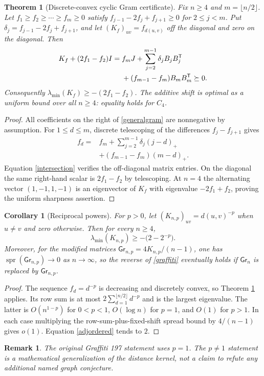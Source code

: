 \documentclass[10pt,twocolumn]{article}
\newtheorem{theorem}{Theorem}
\newtheorem{corollary}{Corollary}
\newtheorem{remark}{Remark}
\newcommand{\Gr}{\mathsf{Gr}}
\newcommand{\spr}{\operatorname{spr}}
\newcommand{\lammin}{\lambda_{\min}}
\begin{document}
\begin{theorem}[Discrete-convex cyclic Gram certificate]\label{general}
Fix $n\ge4$ and $m=\lfloor n/2\rfloor$. Let $f_1\ge f_2\ge\cdots\ge f_m\ge0$ satisfy
$f_{j-1}-2f_j+f_{j+1}\ge0$ for $2\le j<m$.
Put $\delta_j=f_{j-1}-2f_j+f_{j+1}$, and let $(K_f)_{uv}=f_{d(u,v)}$ off the diagonal and zero on the diagonal. Then
\begin{align}\label{generalgram}
K_f+(2f_1-f_2)I
={}&f_mJ+\sum_{j=2}^{m-1}\delta_j B_jB_j^{\mathsf T}\notag\\
&+(f_{m-1}-f_m)B_mB_m^{\mathsf T}\succeq0.
\end{align}
Consequently $\lammin(K_f)\ge-(2f_1-f_2)$. The additive shift is optimal as a uniform bound over all $n\ge4$: equality holds for $C_4$.
\end{theorem}
\begin{proof}
All coefficients on the right of \eqref{generalgram} are nonnegative by assumption. For $1\le d\le m$, discrete telescoping of the differences $f_j-f_{j+1}$ gives
\[\begin{aligned}
f_d={}&f_m+\sum_{j=2}^{m-1}\delta_j(j-d)_+\\
&+(f_{m-1}-f_m)(m-d)_+.
\end{aligned}\]
Equation \eqref{intersection} verifies the off-diagonal matrix entries. On the diagonal the same right-hand scalar is $2f_1-f_2$ by telescoping. At $n=4$ the alternating vector $(1,-1,1,-1)$ is an eigenvector of $K_f$ with eigenvalue $-2f_1+f_2$, proving the uniform sharpness assertion.
\end{proof}

\begin{corollary}[Reciprocal powers]\label{power}
For $p>0$, let $(K_{n,p})_{uv}=d(u,v)^{-p}$ when $u\ne v$ and zero otherwise. Then for every $n\ge4$,
\[
\lammin(K_{n,p})\ge -\bigl(2-2^{-p}\bigr).
\]
Moreover, for the \emph{modified} matrices $\Gr_{n,p}=4K_{n,p}/(n-1)$, one has $\spr(\Gr_{n,p})\to0$ as $n\to\infty$, so the reverse of \eqref{graffiti} eventually holds if $\Gr_n$ is replaced by $\Gr_{n,p}$.
\end{corollary}
\begin{proof}
The sequence $f_d=d^{-p}$ is decreasing and discretely convex, so Theorem \ref{general} applies. Its row sum is at most $2\sum_{d=1}^{\lfloor n/2\rfloor}d^{-p}$ and is the largest eigenvalue. The latter is $O(n^{1-p})$ for $0<p<1$, $O(\log n)$ for $p=1$, and $O(1)$ for $p>1$. In each case multiplying the row-sum-plus-fixed-shift spread bound by $4/(n-1)$ gives $o(1)$. Equation \eqref{adjordered} tends to $2$.
\end{proof}
\begin{remark}
The original Graffiti 197 statement uses $p=1$. The $p\ne1$ statement is a mathematical generalization of the distance kernel, not a claim to refute any additional named graph conjecture.
\end{remark}
\end{document}
